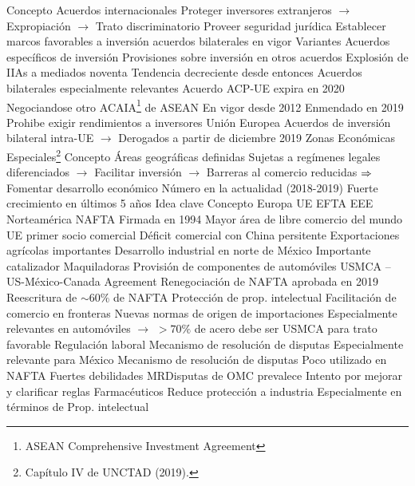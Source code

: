 \documentclass{nuevotema}
\begin{document}
\begin{esquemal}
				\4 Concepto
				\4[] Acuerdos internacionales
				\4[] Proteger inversores extranjeros
				\4[] $\to$ Expropiación
				\4[] $\to$ Trato discriminatorio
				\4[] Proveer seguridad jurídica
				\4[] Establecer marcos favorables a inversión
				 acuerdos bilaterales en vigor
				\4 Variantes
				\4[] Acuerdos específicos de inversión
				\4[] Provisiones sobre inversión en otros acuerdos
				\4 Explosión de IIAs a mediados noventa
				\4 Tendencia decreciente desde entonces
				\4 Acuerdos bilaterales especialmente relevantes
				\4 Acuerdo ACP-UE expira en 2020
				\4[] Negociandose otro
				\4 ACAIA\footnote{ASEAN Comprehensive Investment Agreement} de ASEAN
				\4[] En vigor desde 2012
				\4[] Enmendado en 2019
				\4[] Prohibe exigir rendimientos a inversores
				\4 Unión Europea
				\4[] Acuerdos de inversión bilateral intra-UE
				\4[] $\to$ Derogados a partir de diciembre 2019
			\3 Zonas Económicas Especiales\footnote{Capítulo IV de UNCTAD (2019).}
				\4 Concepto
				\4[] Áreas geográficas definidas
				\4[] Sujetas a regímenes legales diferenciados
				\4[] $\to$ Facilitar inversión
				\4[] $\to$ Barreras al comercio reducidas
				\4[] $\Rightarrow$ Fomentar desarrollo económico
				\4 Número
				 en la actualidad (2018-2019)
				\4[] Fuerte crecimiento en últimos 5 años
	\1 
		\2 Idea clave
			\3 Concepto
		\2 Europa
			\3 UE
			\3 EFTA
			\3 EEE
		\2 Norteamérica
			\3 NAFTA
				\4 Firmada en 1994
				\4 Mayor área de libre comercio del mundo
				\4 UE primer socio comercial
				\4 Déficit comercial con China persitente
				\4 Exportaciones agrícolas importantes
				\4 Desarrollo industrial en norte de México
				\4[] Importante catalizador
				\4[] Maquiladoras
				\4[] Provisión de componentes de automóviles
			\3 USMCA -- US-México-Canada Agreement
				\4 Renegociación de NAFTA aprobada en 2019
				\4 Reescritura de $\sim 60\%$ de NAFTA
				\4 Protección de prop. intelectual
				\4 Facilitación de comercio en fronteras
				\4 Nuevas normas de origen de importaciones
				\4[] Especialmente relevantes en automóviles
				\4[] $\to$ $>70\%$ de acero debe ser USMCA para trato favorable
				\4 Regulación laboral
				\4[] Mecanismo de resolución de disputas
				\4[] Especialmente relevante para México
				\4 Mecanismo de resolución de disputas
				\4[] Poco utilizado en NAFTA
				\4[] Fuertes debilidades
				\4[] MRDisputas de OMC prevalece
				\4[] Intento por mejorar y clarificar reglas
				\4 Farmacéuticos
				\4[] Reduce protección a industria
				\4[] Especialmente en términos de Prop. intelectual

\end{esquemal}
\end{document}
